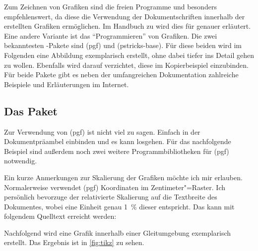 \documentclass[%
  english,ngerman,%
  geometry=no,DIV=12,automark,%
]{tudscrartcl}
\begin{document}
Zum Zeichnen von Grafiken sind die freien Programme  und 
besonders  empfehlenswert, da diese die Verwendung der 
Dokumentschriften innerhalb der erstellten Grafiken ermöglichen. Im Handbuch zu 
\TUDScript wird dies für  
genauer erläutert. Eine andere Variante ist das \enquote{Programmieren} von 
Grafiken. Die zwei bekanntesten -Pakete sind (pgf) 
und (pstricks-base). Für diese beiden wird im Folgenden eine 
Abbildung exemplarisch erstellt, ohne dabei tiefer ins Detail gehen zu wollen. 
Ebenfalls wird darauf verzichtet, diese im Kopierbeispiel einzubinden. Für 
beide Pakete gibt es neben der umfangreichen Dokumentation zahlreiche Beispiele 
und Erläuterungen im Internet.


\subsection{Das Paket }
Zur Verwendung von (pgf) ist nicht viel zu sagen. Einfach in der 
Dokumentpräambel einbinden und es kann losgehen. Für das nachfolgende Beispiel 
sind außerdem noch zwei weitere Programmbibliotheken für (pgf) 
notwendig.
%
\begin{Hint}
\usepackage{tikz}
\usetikzlibrary{chains}
\usetikzlibrary{decorations.markings}
\tikzset{on grid}
\end{Hint}
%
Ein kurze Anmerkungen zur Skalierung der Grafiken möchte ich mir erlauben. 
Normalerweise verwendet (pgf) Koordinaten im Zentimeter"=Raster. 
Ich persönlich bevorzuge der relativierte Skalierung auf die Textbreite des 
Dokumentes, wobei eine Einheit genau \SI{1}{\percent} dieser entspricht. Das 
kann mit folgendem Quelltext erreicht werden:
%
\CodeHook{\renewcommand\newlength[1]{}}
\begin{Hint*}
\newlength{\tikzunit}
\setlength{\tikzunit}{.01\textwidth}
\tikzset{x=\tikzunit,y=\tikzunit}
\end{Hint*}
%
Nachfolgend wird eine Grafik innerhalb einer Gleitumgebung exemplarisch 
erstellt. Das Ergebnis ist in \autoref{fig:tikz} zu sehen.
\end{document}
